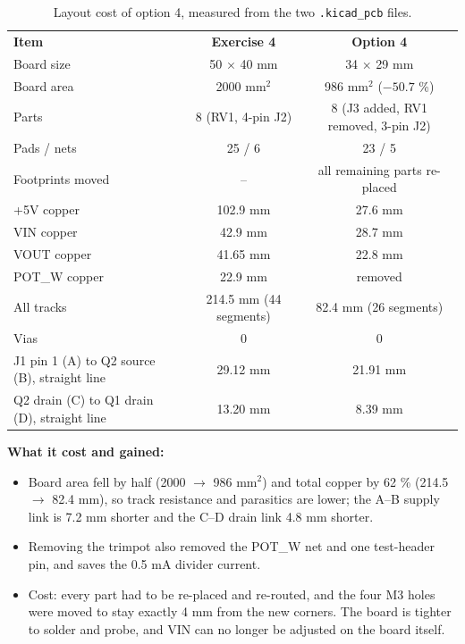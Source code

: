 \documentclass[11pt,a4paper]{article}
\begin{document}
\begin{table}[H]\centering\small\sffamily
\begin{tabular}{@{}lcc@{}}\rowcolor{teal}\color{white}\textbf{Item}&\color{white}\textbf{Exercise 4}&\color{white}\textbf{Option 4}\\
Board size&50 $\times$ 40 mm&34 $\times$ 29 mm\\
\rowcolor{mist}Board area&2000 mm$^2$&986 mm$^2$ ($-50.7$ \%)\\
Parts&8 (RV1, 4-pin J2)&8 (J3 added, RV1 removed, 3-pin J2)\\
\rowcolor{mist}Pads / nets&25 / 6&23 / 5\\
Footprints moved&--&all remaining parts re-placed\\
\rowcolor{mist}+5V copper&102.9 mm&27.6 mm\\
VIN copper&42.9 mm&28.7 mm\\
\rowcolor{mist}VOUT copper&41.65 mm&22.8 mm\\
POT\_W copper&22.9 mm&removed\\
\rowcolor{mist}All tracks&214.5 mm (44 segments)&82.4 mm (26 segments)\\
Vias&0&0\\
\rowcolor{mist}J1 pin 1 (A) to Q2 source (B), straight line&29.12 mm&21.91 mm\\
Q2 drain (C) to Q1 drain (D), straight line&13.20 mm&8.39 mm\\\end{tabular}
\caption{Layout cost of option 4, measured from the two \texttt{.kicad\_pcb} files.}\end{table}
\begin{answer}
\textbf{What it cost and gained:}
\begin{itemize}
\item Board area fell by half (2000 $\to$ 986 mm$^2$) and total copper by 62 \% (214.5 $\to$ 82.4 mm), so track resistance and parasitics are lower; the A--B supply link is 7.2 mm shorter and the C--D drain link 4.8 mm shorter.
\item Removing the trimpot also removed the POT\_W net and one test-header pin, and saves the 0.5 mA divider current.
\item Cost: every part had to be re-placed and re-routed, and the four M3 holes were moved to stay exactly 4 mm from the new corners. The board is tighter to solder and probe, and VIN can no longer be adjusted on the board itself.
\end{itemize}
\end{answer}
\end{document}
